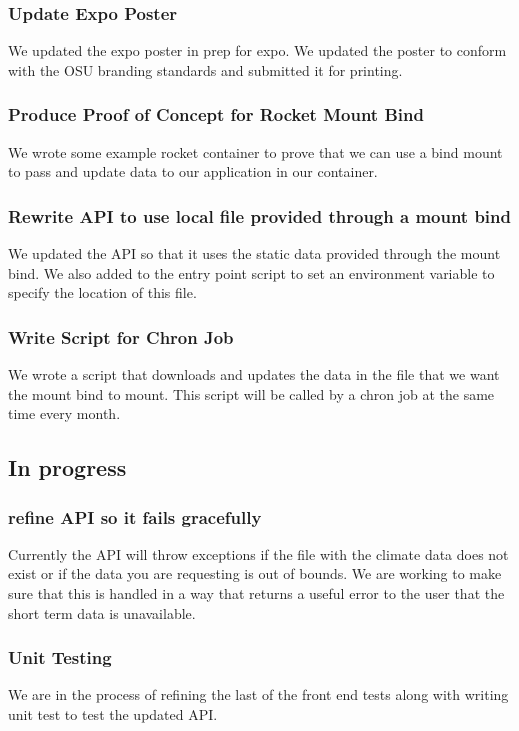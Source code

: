 \documentclass[onecolumn, draftclsnofoot,10pt, compsoc]{article}
\begin{document}
		\subsubsection{Update Expo Poster} We updated the expo poster in prep for expo. We updated the poster to conform with the OSU branding standards and submitted it for printing.\\
		
		\subsubsection{Produce Proof of Concept for Rocket Mount Bind} We wrote some example rocket container to prove that we can use a bind mount to pass and update data to our application in our container. 
		
		\subsubsection{Rewrite API to use local file provided through a mount bind} We updated the API so that it uses the static data provided through the mount bind. We also added to the entry point script to set an environment variable to specify the location of this file.\\
		
		\subsubsection{Write Script for Chron Job} We wrote a script that downloads and updates the data in the file that we want the mount bind to mount. This script will be called by a chron job at the same time every month.\\

	\subsection{In progress}
		\subsubsection{refine API so it fails gracefully} Currently the API will throw exceptions if the file with the climate data does not exist or if the data you are requesting is out of bounds. We are working to make sure that this is handled in a way that returns a useful error to the user that the short term data is unavailable.\\
		
		\subsubsection{Unit Testing} We are in the process of refining the last of the front end tests along with writing unit test to test the updated API.\\
		
\end{document}
